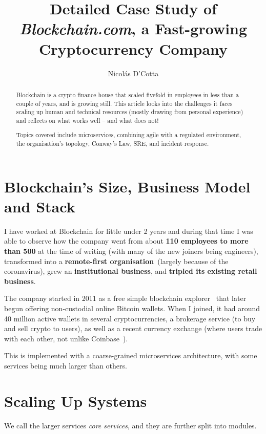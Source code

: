 \documentclass[conference]{IEEEtran}
\title{Detailed Case Study of \emph{Blockchain.com}, a Fast-growing Cryptocurrency Company}
\begin{document}
    \author{Nicolás D'Cotta}

    \maketitle

    \begin{abstract}
        Blockchain is a crypto finance house that scaled fivefold in
        employees in less than a couple of years, and is growing still.
        This article looks into the challenges it faces scaling up human and
        technical resources (mostly drawing from personal experience) and reflects
        on what works well -- and what does not!

        Topics covered include microservices, combining agile with a regulated environment, the organisation's topology, Conway's Law, SRE, and incident response.
    \end{abstract}


    \section{Blockchain's Size, Business Model and Stack}\label{sec:business}

    I have worked at Blockchain for little under 2 years and during that time I was able to observe
    how the company went from about \textbf{110 employees to more than 500} at the time of writing (with many
    of the new joiners being engineers), transformed into a \textbf{remote-first organisation}~(largely because
    of the coronavirus), grew an \textbf{institutional business}, and \textbf{tripled its existing retail business}.

    The company started in 2011 as a free simple blockchain explorer~\cite{bcAbout} that later
    begun offering non-custodial online Bitcoin wallets.
    When I joined, it had around 40 million active wallets in several cryptocurrencies,
    a brokerage service (to buy and sell crypto to users), as well as a recent currency
    exchange (where users trade with each other, not unlike Coinbase~\cite{coinbasePro}).

    This is implemented with a coarse-grained microservices architecture, with some services
    being much larger than others.


    \section{Scaling Up Systems}
    We call the larger services \emph{core services}, and they are further split into modules.
\end{document}
